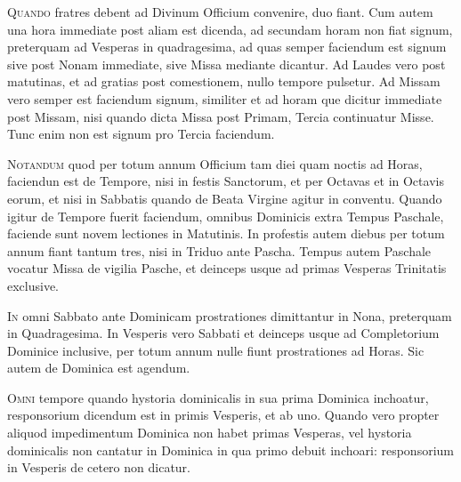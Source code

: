 
\thispagestyle{fancy}

\vspace{+10pt}
\color{Red}\color{black}

\begin{multicols*}{2}


{\color{Red} }
\lettrine[lines=4]{\zallmancaps \color{Blue} Q}{uando} fratres debent ad Divinum Officium convenire, duo fiant. Cum autem una hora immediate post aliam est dicenda, ad secundam horam non fiat signum, preterquam ad Vesperas in quadragesima, ad quas semper faciendum est signum sive post Nonam immediate, sive Missa mediante dicantur.
Ad Laudes vero post matutinas, et ad gratias post comestionem, nullo tempore pulsetur.
Ad Missam vero semper est faciendum signum, similiter et ad horam que dicitur immediate post Missam, nisi quando dicta Missa post Primam, Tercia continuatur Misse. Tunc enim non est signum pro Tercia faciendum.

{\color{Red} }
\lettrine[lines=2]{\zallmancaps \color{Red} N}{otandum} quod per totum annum Officium tam diei quam noctis ad Horas, faciendun est de Tempore, nisi in festis Sanctorum, et per Octavas et in Octavis eorum, et nisi in Sabbatis quando de Beata Virgine agitur in conventu.
Quando igitur de Tempore fuerit faciendum, omnibus Dominicis extra Tempus Paschale, faciende sunt novem lectiones in Matutinis. In profestis autem diebus per totum annum fiant tantum tres, nisi in Triduo ante Pascha. Tempus autem Paschale vocatur Missa de vigilia Pasche, et deinceps usque ad primas Vesperas Trinitatis exclusive.

{\color{Red} }
\lettrine[lines=2]{\zallmancaps \color{Blue} I}{n} omni Sabbato ante Dominicam prostrationes dimittantur in Nona, preterquam in Quadragesima. In Vesperis vero Sabbati et deinceps usque ad Completorium Dominice inclusive, per totum annum nulle fiunt prostrationes ad Horas. Sic autem de Dominica est agendum.

{\color{Red} }
\lettrine[lines=2]{\zallmancaps \color{Red} O}{mni} tempore quando hystoria dominicalis in sua prima Dominica inchoatur, responsorium dicendum est in primis Vesperis, et ab uno. Quando vero propter aliquod impedimentum Dominica non habet primas Vesperas, vel hystoria dominicalis non cantatur in Dominica in qua primo debuit inchoari: responsorium in Vesperis de cetero non dicatur.


\end{multicols*}
